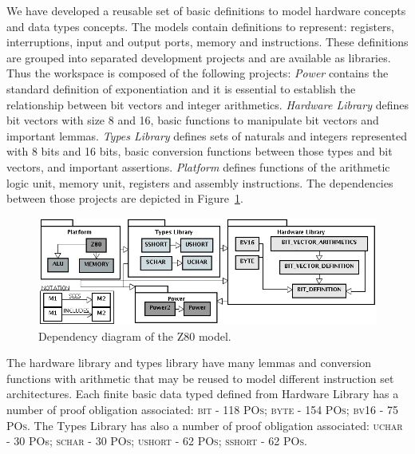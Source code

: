 \documentclass[a4paper]{llncs}
\begin{document}
We have developed a reusable set of basic definitions to model
hardware concepts and data types concepts. The models contain
definitions to represent: registers, interruptions, input and
output ports, memory and instructions. These definitions are grouped
into separated development projects and are available as libraries.
Thus the workspace is composed of the following projects: \textit{Power}
contains the standard definition of exponentiation and it is essential
to establish the relationship between bit vectors
and integer arithmetics. \textit{Hardware Library} defines bit vectors
with size 8 and 16, basic functions to manipulate bit vectors and
important lemmas. \textit{Types Library} defines sets of naturals and integers represented
with 8 bits and 16 bits, basic conversion functions between those
types and bit vectors, and important assertions. \textit{Platform} defines functions of the arithmetic logic unit, memory
unit, registers and assembly instructions. The dependencies between those projects are depicted in
Figure~\ref{fig:hardware-definition-graph}.

\begin{figure}[h]
\centering
\includegraphics[width=.87\textwidth]{diagramaEstrutural_vertical_ProB2.png}
 \caption{Dependency diagram of the Z80 model.}
\label{fig:hardware-definition-graph}
\end{figure}




The hardware library and types library have many lemmas and conversion functions with arithmetic that may be reused to model different instruction set architectures. Each finite basic data typed defined from Hardware Library has a number of proof obligation associated: 
\textsc{bit} - 118 {\small \textsc{POs}}; \textsc{byte} - 154 {\small \textsc{POs}}; \textsc{bv16} - 75 {\small \textsc{POs}}. 
The Types Library has also a number of proof obligation associated: \textsc{uchar} -  30 {POs}; \textsc{schar} - 30 {\small \textsc{POs}}; \textsc{ushort} - 62 {\small \textsc{POs}}; \textsc{sshort}  - 62 {\small \textsc{POs}}.
\end{document}
